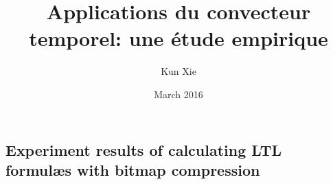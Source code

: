 \documentclass[times,twoside,these]{uqac-these}
\newcommand{\UqacTheseTitre}{Applications du convecteur temporel: une étude empirique}
\newcommand{\UqacTheseAuteur}{Kun Xie}
\newcommand{\UqacTheseDate}{March 2016}
\begin{document}
  
\title{\UqacTheseTitre}
\author{\UqacTheseAuteur}
\date{\UqacTheseDate}
\thispagestyle{empty}
\maketitle

\frontmatter

\doublespacing




\singlespacing
\cleardoublepage
\pdfbookmark{\contentsname}{\contentsname}
\label{\contentsname}
\tableofcontents
\newpage

\label{\listfigurename}
\listoffigures
\newpage

\label{\listtablename}
\listoftables
\newpage

\mainmatter
\doublespacing
% 







% 

\begin{appendices}
\chapter{Experiment results of calculating LTL formul\ae{}s with bitmap compression}
\label{appendixa}

\end{appendices}

\backmatter
% 

\clearpage
{}



\end{document}
